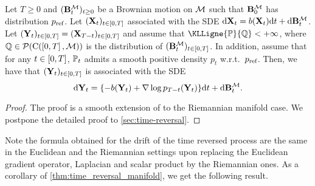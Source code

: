 \begin{theorem}
  \label{thm:time_reversal_manifold}
  Let $T \geq 0$ and $(\mathbf{B}_t^\mathcal M)_{t \geq 0}$ be a Brownian motion on $\mathcal M$ such
  that $\mathbf{B}_0^\mathcal M$ has distribution $p_{\textup{ref}}$.  Let
  $(\mathbf{X}_t)_{t \in \left[0,T\right]}$ associated with the SDE
  $\mathrm{d} \mathbf{X}_t = b(\mathbf{X}_t) \mathrm{d} t + \mathrm{d} \mathbf{B}_t^\mathcal M$.  Let
  $(\mathbf{Y}_t)_{t \in \left[0,T\right]} = (\mathbf{X}_{T-t})_{t \in \left[0,T\right]}$ and assume
  that $\KLLigne{\Pbb}{\Qbb} < +\infty$, where
  $\mathbb{Q} \in \mathcal{P}(\mathrm{C}(\left[0,T\right], \mathcal M))$ is the distribution of
  $(\mathbf{B}_t^\mathcal M)_{t \in \left[0,T\right]}$. In addition, assume that for any
  $t \in \left[0,T\right]$, $\mathbb{P}_t$ admits a smooth positive density $p_t$ w.r.t.\
  $p_{\textup{ref}}$. Then, we have that $(\mathbf{Y}_t)_{t \in \left[0,T\right]}$ is associated with
  the SDE
  \begin{equation}
    \label{eq:time_reversal_manifold}
   \mathrm{d} \mathbf{Y}_t = \{-b(\mathbf{Y}_t) + \nabla \log p_{T-t}(\mathbf{Y}_t)\} \mathrm{d} t + \mathrm{d} \mathbf{B}_t^\mathcal M. 
  \end{equation}
\end{theorem}

\begin{proof}
  The proof is a smooth extension of \citet[Theorem 4.9]{cattiaux2021time} to the
  Riemannian manifold case. We postpone the detailed proof to
  \cref{sec:time-reversal}.
\end{proof}

Note the formula obtained for the drift of the time reversed process are the
same in the Euclidean and the Riemannian settings upon replacing the Euclidean
gradient operator, Laplacian and scalar product by the Riemannian ones.  As a
corollary of \cref{thm:time_reversal_manifold}, we get the following result.


